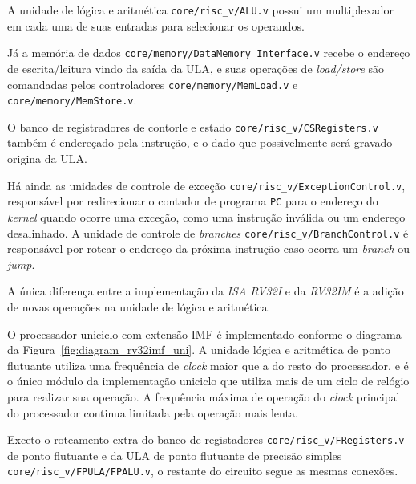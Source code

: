         { A unidade de lógica e aritmética \texttt{core/risc\_v/ALU.v} possui um
            multiplexador em cada uma de suas entradas para selecionar os operandos.
        }

        {
            Já a memória de dados \texttt{core/memory/DataMemory\_Interface.v}
            recebe o endereço de escrita/leitura vindo da saída da ULA, e suas
            operações de \textit{load/store} são comandadas pelos controladores
            \texttt{core/memory/MemLoad.v} e \texttt{core/memory/MemStore.v}.
        }

        { O banco de registradores de contorle e estado \texttt{core/risc\_v/CSRegisters.v}
            também é endereçado pela instrução, e o dado que possivelmente será
            gravado origina da ULA.
        }

        { Há ainda as unidades de controle de exceção \texttt{core/risc\_v/ExceptionControl.v},
            responsável por redirecionar o contador de programa \texttt{PC} para
            o endereço do \textit{kernel} quando ocorre uma exceção, como uma
            instrução inválida ou um endereço desalinhado. A unidade de controle
            de \textit{branches} \texttt{core/risc\_v/BranchControl.v} é responsável
            por rotear o endereço da próxima instrução caso ocorra um \textit{branch}
            ou \textit{jump}.
        }

        { A única diferença entre a implementação da \textit{ISA RV32I} e da
            \textit{RV32IM} é a adição de novas operações na unidade de lógica e
            aritmética.
        }

        { O processador uniciclo com extensão IMF é implementado conforme o
            diagrama da Figura~\ref{fig:diagram_rv32imf_uni}. A unidade lógica e
            aritmética de ponto flutuante utiliza uma frequência de \textit{clock}
            maior que a do resto do processador, e é o único módulo da implementação
            uniciclo que utiliza mais de um ciclo de relógio para realizar sua
            operação. A frequência máxima de operação do \textit{clock} principal
            do processador continua limitada pela operação mais lenta.
        }

        { Exceto o roteamento extra do banco de registadores \texttt{core/risc\_v/FRegisters.v}
            de ponto flutuante e da ULA de ponto flutuante de precisão simples
            \texttt{core/risc\_v/FPULA/FPALU.v}, o restante do circuito segue as mesmas conexões.
        }

